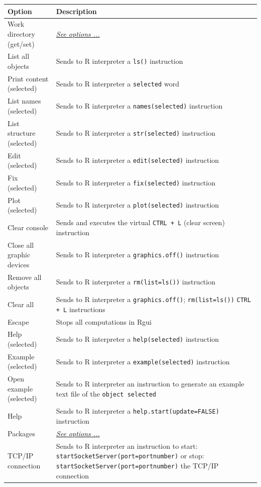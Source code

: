 \begin{scriptsize}
  \begin{tabularx}{\headwidth}{>{\hsize=0.4\hsize}X>{\hsize=0.7\hsize}X}\\
    \hline
    \textbf{Option} & \textbf{Description} \\
    \hline
    Work directory (get/set) &  \textit{\href{\#menu\_r\_control\_workdir}{See options ...}} \\
    List all objects & Sends to R interpreter a \texttt{ls()} instruction \\
    Print content (selected) & Sends to R interpreter a \texttt{selected} word \\
    List names (selected) & Sends to R interpreter a \texttt{names(selected)} instruction \\
    List structure (selected) & Sends to R interpreter a \texttt{str(selected)} instruction \\
    Edit (selected) & Sends to R interpreter a \texttt{edit(selected)} instruction \\
    Fix (selected) & Sends to R interpreter a \texttt{fix(selected)} instruction \\
    Plot (selected) & Sends to R interpreter a \texttt{plot(selected)} instruction \\
    Clear console & Sends and executes the virtual \texttt{CTRL + L} (clear screen) instruction \\
    Close all graphic devices & Sends to R interpreter a \texttt{graphics.off()} instruction \\
    Remove all objects & Sends to R interpreter a \texttt{rm(list=ls())} instruction \\
    Clear all & Sends to R interpreter a \texttt{graphics.off()}; \texttt{rm(list=ls())} \texttt{CTRL + L} instructions \\
    Escape & Stops all computations in Rgui \\
    Help (selected) & Sends to R interpreter a \texttt{help(selected)} instruction \\
    Example (selected) & Sends to R interpreter a \texttt{example(selected)} instruction \\
    Open example (selected) & Sends to R interpreter an instruction to generate an example text file of the \texttt{object selected}\\
    Help & Sends to R interpreter a \texttt{help.start(update=FALSE)} instruction \\
    Packages & \textit{\href{\#menu\_r\_control\_packages}{See options ...}} \\
    TCP/IP connection & Sends to R interpreter an instruction to start: \texttt{startSocketServer(port=portnumber)} or stop: \texttt{startSocketServer(port=portnumber)} the TCP/IP connection \\
    \hline
  \end{tabularx}
\end{scriptsize}


